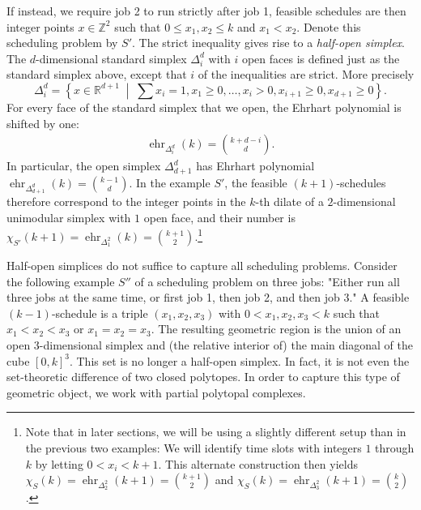 \documentclass[12pt,reqno]{amsart}
\numberwithin{definition}{section}
\theoremstyle{definition}
\newcommand{\RR}{\mathbb{R}}
\newcommand{\ZZ}{\mathbb{Z}}
\newcommand{\ehr}{\operatorname{ehr}}
\newcommand{\mset}[2]{ \left\{ #1 \; \middle| \; #2 \right\}}
\begin{document}
If instead, we require job 2 to run strictly after job 1, feasible schedules are then integer points $x\in\ZZ^2$ such that $0\leq x_1,x_2 \leq k$ and $x_1 < x_2$. Denote this scheduling problem by $S'$. The strict inequality gives rise to a \emph{half-open simplex}. The $d$-dimensional standard simplex $\Delta^d_i$ with $i$ open faces is defined just as the standard simplex above, except that $i$ of the inequalities are strict. More precisely
\[
    \Delta^d_i = \mset{x\in\RR^{d+1}}{\sum x_i =1, x_1 \geq 0, \ldots, x_i > 0, x_{i+1} \geq 0, x_{d+1} \geq 0}.
\]
For every face of the standard simplex that we open, the Ehrhart polynomial is shifted by one:
\begin{eqnarray}
  \ehr_{\Delta^d_i}(k) = \binom{k+d-i}{d}.
  \label{eqn:half-open-simplex}
\end{eqnarray}
In particular, the open simplex $\Delta^d_{d+1}$ has Ehrhart polynomial $\ehr_{\Delta^d_{d+1}}(k) = \binom{k-1}{d}$. In the example $S'$, the feasible $(k+1)$-schedules therefore correspond to the integer points in the $k$-th dilate of a $2$-dimensional unimodular simplex with $1$ open face, and their number is $\chi_{S'}(k+1)=\ehr_{\Delta^2_1}(k) = \binom{k+1}{2}$.\footnote{Note that in later sections, we will be using a slightly different setup than in the previous two examples: We will identify time slots with integers $1$ through $k$ by letting $0<x_i<k+1$. This alternate construction then yields $\chi_S(k)=\ehr_{\Delta^2_2}(k+1)=\binom{k+1}{2}$ and $\chi_S(k)=\ehr_{\Delta^2_3}(k+1)=\binom{k}{2}$.}

Half-open simplices do not suffice to capture all scheduling problems. Consider the following example $S''$ of a scheduling problem on three jobs: "Either run all three jobs at the same time, or first job 1, then job 2, and then job 3." A feasible $(k-1)$-schedule is a triple $(x_1,x_2,x_3)$ with $0< x_1,x_2,x_3 < k$ such that $x_1<x_2<x_3$ or $x_1=x_2=x_3$. The resulting geometric region is the union of an open 3-dimensional simplex and (the relative interior of) the main diagonal of the cube $[0,k]^3$. This set is no longer a half-open simplex. In fact, it is not even the set-theoretic difference of two closed polytopes. In order to capture this type of geometric object, we work with partial polytopal complexes.

%
\end{document}

